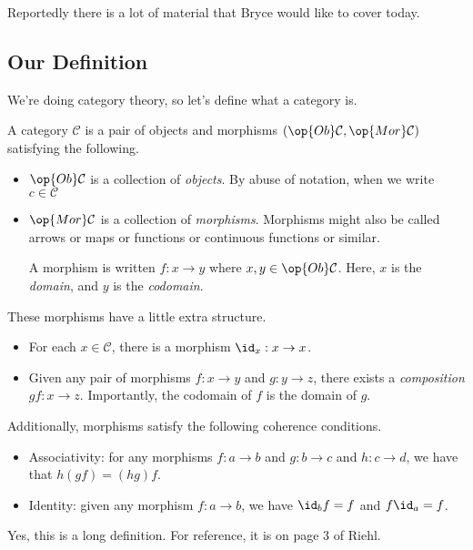 







Reportedly there is a lot of material that Bryce would like to cover today.

\subsection{Our Definition}
We're doing category theory, so let's define what a category is.
\begin{definition}[Category]
	A category $\mathcal C$ is a pair of objects and morphisms $(\op{Ob}\mathcal C,\op{Mor}\mathcal C)$ satisfying the following.
	\begin{itemize}
		\item $\op{Ob}\mathcal C$ is a collection of \textit{objects}. By abuse of notation, when we write $c\in\mathcal C$ 
		\item $\op{Mor}\mathcal C$ is a collection of \textit{morphisms}. Morphisms might also be called arrows or maps or functions or continuous functions or similar.

		A morphism is written $f:x\to y$ where $x,y\in\op{Ob}\mathcal C$. Here, $x$ is the \textit{domain}, and $y$ is the \textit{codomain}.
	\end{itemize}
	These morphisms have a little extra structure.
	\begin{itemize}
		\item For each $x\in\mathcal C$, there is a morphism $\id_x:x\to x$.
		\item Given any pair of morphisms $f:x\to y$ and $g:y\to z$, there exists a \textit{composition} $gf:x\to z$. Importantly, the codomain of $f$ is the domain of $g$.
	\end{itemize}
	Additionally, morphisms satisfy the following coherence conditions.
	\begin{itemize}
		\item Associativity: for any morphisms $f:a\to b$ and $g:b\to c$ and $h:c\to d$, we have that $h(gf)=(hg)f$.
		\item Identity: given any morphism $f:a\to b$, we have $\id_bf=f$ and $f\id_a=f$.
	\end{itemize}
\end{definition}
\noindent Yes, this is a long definition. For reference, it is on page 3 of Riehl.

